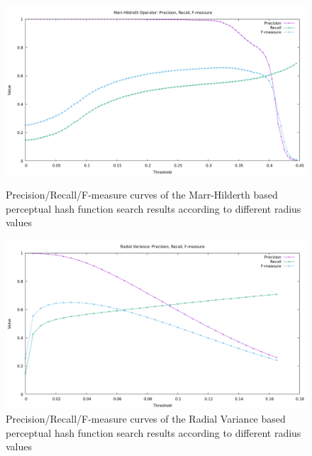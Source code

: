 \begin{figure}
	\centering
	\includegraphics[width=\textwidth]{img/benchmark_mh.png}
	\caption{Precision/Recall/F-measure curves of the Marr-Hilderth based perceptual hash function search results according to different radius values}
	\label{fig:benchmark_mh}
	
	\includegraphics[width=\textwidth]{img/benchmark_rv.png}
	\caption{Precision/Recall/F-measure curves of the Radial Variance based perceptual hash function search results according to different radius values}
	\label{fig:benchmark_rv}
\end{figure}